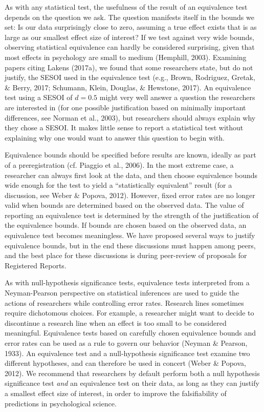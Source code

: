 \documentclass[english,floatsintext,man]{apa6}
\theoremstyle{definition}
\theoremstyle{definition}
\theoremstyle{definition}
\theoremstyle{remark}
\begin{document}
As with any statistical test, the usefulness of the result of an
equivalence test depends on the question we ask. The question manifests
itself in the bounds we set: Is our data surprisingly close to zero,
assuming a true effect exists that is as large as our smallest effect
size of interest? If we test against very wide bounds, observing
statistical equivalence can hardly be considered surprising, given that
most effects in psychology are small to medium (Hemphill, 2003).
Examining papers citing Lakens (2017a), we found that some researchers
state, but do not justify, the SESOI used in the equivalence test (e.g.,
Brown, Rodriguez, Gretak, \& Berry, 2017; Schumann, Klein, Douglas, \&
Hewstone, 2017). An equivalence test using a SESOI of \(d = 0.5\) might
very well answer a question the researchers are interested in (for one
possible justification based on minimally important differences, see
Norman et al., 2003), but researchers should always explain why they
chose a SESOI. It makes little sense to report a statistical test
without explaining why one would want to answer this question to begin
with.

Equivalence bounds should be specified before results are known, ideally
as part of a preregistration (cf. Piaggio et al., 2006). In the most
extreme case, a researcher can always first look at the data, and then
choose equivalence bounds wide enough for the test to yield a
\enquote{statistically equivalent} result (for a discussion, see Weber
\& Popova, 2012). However, fixed error rates are no longer valid when
bounds are determined based on the observed data. The value of reporting
an equivalence test is determined by the strength of the justification
of the equivalence bounds. If bounds are chosen based on the observed
data, an equivalence test becomes meaningless. We have proposed several
ways to justify equivalence bounds, but in the end these discussions
must happen among peers, and the best place for these discussions is
during peer-review of proposals for Registered Reports.

As with null-hypothesis significance tests, equivalence tests
interpreted from a Neyman-Pearson perspective on statistical inferences
are used to guide the actions of researchers while controlling error
rates. Research lines sometimes require dichotomous choices. For
example, a researcher might want to decide to discontinue a research
line when an effect is too small to be considered meaningful.
Equivalence tests based on carefully chosen equivalence bounds and error
rates can be used as a rule to govern our behavior (Neyman \& Pearson,
1933). An equivalence test and a null-hypothesis significance test
examine two different hypotheses, and can therefore be used in concert
(Weber \& Popova, 2012). We recommend that researchers by default
perform both a null hypothesis significance test \emph{and} an
equivalence test on their data, as long as they can justify a smallest
effect size of interest, in order to improve the falsifiability of
predictions in psychological science.
\end{document}
